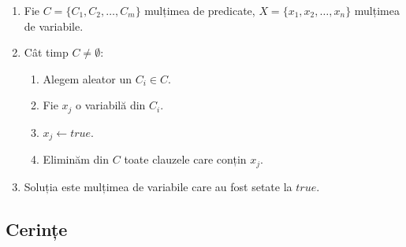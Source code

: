 \documentclass[a4paper,12pt]{article}
\begin{document}
\begin{enumerate}
      \item
            Fie $C = \{C_1, C_2, \dots, C_m\}$ mulțimea de predicate,
            $X = \{x_1, x_2, \dots, x_n\}$ mulțimea de variabile.
      \item
            Cât timp $C \neq \emptyset$:
            \begin{enumerate}
                  \item Alegem aleator un $C_i \in C$.
                  \item Fie $x_j$ o variabilă din $C_i$.
                  \item $x_j \leftarrow true$.
                  \item Eliminăm din $C$ toate clauzele care conțin $x_j$.
            \end{enumerate}
      \item Soluția este mulțimea de variabile care au fost setate la $true$.
\end{enumerate}

\subsection{Cerințe}
\end{document}
